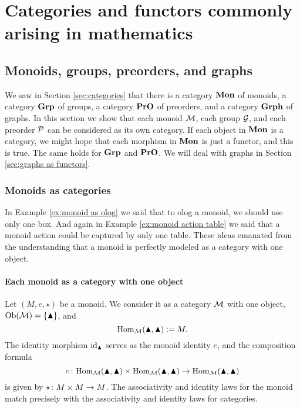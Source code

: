 

\section{Categories and functors commonly arising in mathematics}


\subsection{Monoids, groups, preorders, and graphs}\label{sec:mon grp pro as cat}

We saw in Section \ref{sec:categories} that there is a category ${\bf Mon}$ of monoids, a category ${\bf Grp}$ of groups, a category ${\bf PrO}$ of preorders, and a category ${\bf Grph}$ of graphs. In this section we show that each monoid $\mathcal{M}$, each group $\mathcal{G}$, and each preorder $\mathcal{P}$ can be considered as its own category. If each object in ${\bf Mon}$ is a category, we might hope that each morphism in ${\bf Mon}$ is just a functor, and this is true. The same holds for ${\bf Grp}$ and ${\bf PrO}$. We will deal with graphs in Section \ref{sec:graphs as functors}.


\subsubsection{Monoids as categories}\label{sec:monoids as cats}

In Example \ref{ex:monoid as olog} we said that to olog a monoid, we should use only one box. And again in Example \ref{ex:monoid action table} we said that a monoid action could be captured by only one table. These ideas emanated from the understanding that a monoid is perfectly modeled as a category with one object. 

\paragraph{Each monoid as a category with one object}

Let $(M,e,\star)$ be a monoid. We consider it as a category $\mathcal{M}$ with one object, $\textnormal{Ob}(\mathcal{M})=\{\blacktriangle\}$, and $$\textnormal{Hom}_\mathcal{M}(\blacktriangle,\blacktriangle):=M.$$ The identity morphism $\textnormal{id}_\blacktriangle$ serves as the monoid identity $e$, and the composition formula $$\circ\colon\textnormal{Hom}_\mathcal{M}(\blacktriangle,\blacktriangle)\times\textnormal{Hom}_\mathcal{M}(\blacktriangle,\blacktriangle)\rightarrow\textnormal{Hom}_\mathcal{M}(\blacktriangle,\blacktriangle)$$ is given by $\star\colon M\times M\rightarrow M$. The associativity and identity laws for the monoid match precisely with the associativity and identity laws for categories.

